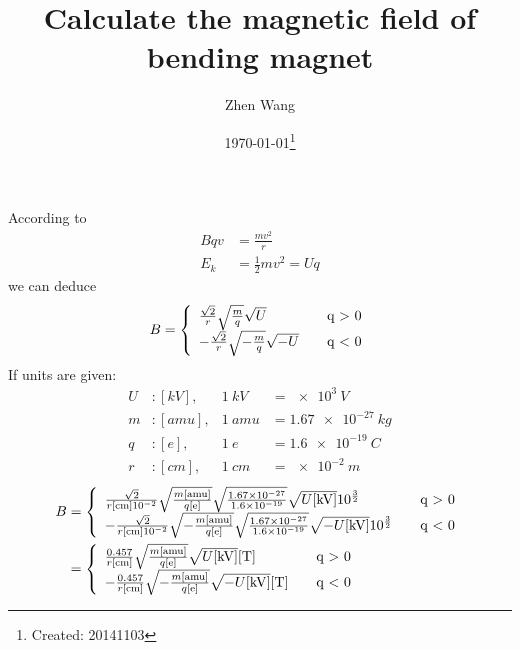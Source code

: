 \documentclass[letterpaper,11pt,pdftex]{article}
\title{Calculate the magnetic field of bending magnet }
\author{Zhen Wang}
\date{\today\footnote{Created: 20141103}}
\begin{document}
\maketitle

According to 
\begin{align}
    \label{eq:1}
    Bqv &= \frac{m{v}^{2}}{r} \\ 
    {E}_{k} &= \frac{1}{2}m{v}^{2 }= Uq             
\end{align}
we can deduce
\begin{align}
 B = \left\{
            \begin{array}{l l}
                \frac{\sqrt{2}}{r}\sqrt{\frac{m}{q}}\sqrt{U} & \quad $q > 0$ \\ 
                -\frac{\sqrt{2}}{r}\sqrt{-\frac{m}{q}}\sqrt{-U} & \quad $q < 0$ 
            \end{array}
        \right.
\end{align}        
If units are given:
\begin{align}
    U &: [\si{kV}],  & \SI{1}{kV}  &= \SI{e3}{V} \\ 
    m &: [\si{amu}], & \SI{1}{amu} &= \SI{1.67e-27}{kg} \\ 
    q &: [\si{e}],   & \SI{1}{e}   &= \SI{1.6e-19}{C} \\ 
    r &: [\si{cm}],  & \SI{1}{cm}  &= \SI{e-2}{m}
\end{align}
\begingroup
\Large
\begin{align}
    B & = \left\{
            \begin{array}{l l}
                \frac{\sqrt{2}}{r[\si{cm}]\SI{e-2}{}}\sqrt{\frac{m[\si{amu}]}{q[\si{e}]}}\sqrt{\frac{\SI{1.67e-27}{}}{\SI{1.6e-19}{}}}\sqrt{U[\si{kV}]}10^{\frac{3}{2}}  & \quad $q > 0$  \\ 
                -\frac{\sqrt{2}}{r[\si{cm}]\SI{e-2}{}}\sqrt{-\frac{m[\si{amu}]}{q[\si{e}]}}\sqrt{\frac{\SI{1.67e-27}{}}{\SI{1.6e-19}{}}}\sqrt{-U[\si{kV}]}10^{\frac{3}{2}}  & \quad $q < 0$  
            \end{array}
        \right. \\   
      & = \left\{
            \begin{array}{l l}
                \frac{0.457}{r[\si{cm}]}\sqrt{\frac{m[\si{amu}]}{q[\si{e}]}}\sqrt{U[\si{kV}]} [\si{T}] & \quad $q > 0$  \\ 
                -\frac{0.457}{r[\si{cm}]}\sqrt{-\frac{m[\si{amu}]}{q[\si{e}]}}\sqrt{-U[\si{kV}]} [\si{T}] & \quad $q < 0$ 
            \end{array}
        \right.       
\end{align}
\endgroup
\setlength{\tabcolsep}{9pt} %
\renewcommand{\arraystretch}{1.5}%
\end{document}
